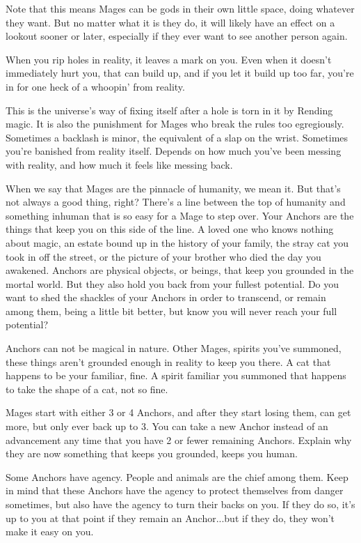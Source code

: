 \documentclass[letterpaper,12pt]{article}
\newcommand{\SECTION}[1]{\vspace{.5em}{\noindent\titlefont\large\textbf{#1}}

}
\begin{document}
Note that this means Mages can be gods in their own little space,
doing whatever they want. But no matter what it is they do, it will
likely have an effect on a lookout sooner or later, especially if they
ever want to see another person again.

\SECTION{Discord}
When you rip holes in reality, it leaves a mark on you. Even when it
doesn't immediately hurt you, that can build up, and if you let it
build up too far, you're in for one heck of a whoopin' from reality.

\SECTION{Backlash}
This is the universe's way of fixing itself after a hole is torn in it
by Rending magic. It is also the punishment for Mages who break the
rules too egregiously. Sometimes a backlash is minor, the equivalent
of a slap on the wrist. Sometimes you're banished from reality
itself. Depends on how much you've been messing with reality, and how
much it feels like messing back.

\SECTION{Anchor}
When we say that Mages are the pinnacle of humanity, we mean it. But
that's not always a good thing, right? There's a line between the top
of humanity and something inhuman that is so easy for a Mage to step
over. Your Anchors are the things that keep you on this side of the
line. A loved one who knows nothing about magic, an estate bound up in
the history of your family, the stray cat you took in off the street,
or the picture of your brother who died the day you awakened. Anchors
are physical objects, or beings, that keep you grounded in the mortal
world. But they also hold you back from your fullest potential. Do you
want to shed the shackles of your Anchors in order to transcend, or
remain among them, being a little bit better, but know you will never
reach your full potential?

Anchors can not be magical in nature. Other Mages, spirits you've
summoned, these things aren't grounded enough in reality to keep you
there. A cat that happens to be your familiar, fine. A spirit familiar
you summoned that happens to take the shape of a cat, not so fine.

Mages start with either 3 or 4 Anchors, and after they start losing
them, can get more, but only ever back up to 3. You can take a new
Anchor instead of an advancement any time that you have 2 or fewer
remaining Anchors. Explain why they are now something that keeps you
grounded, keeps you human.

Some Anchors have agency. People and animals are the chief among
them. Keep in mind that these Anchors have the agency to protect
themselves from danger sometimes, but also have the agency to turn
their backs on you. If they do so, it's up to you at that point if
they remain an Anchor...but if they do, they won't make it easy on
you.
\end{document}
